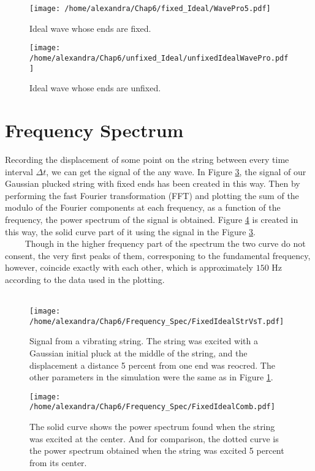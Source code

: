 \documentclass[a4paper,11pt]{article}
\begin{document}
\begin{figure}[htbp]
\centering
\texttt{[image: /home/alexandra/Chap6/fixed\_Ideal/WavePro5.pdf]}
\caption{\sf \small Ideal wave whose ends are fixed.}
\label{fig1}
\end{figure}
\begin{figure}[htbp]
\centering
\texttt{[image: /home/alexandra/Chap6/unfixed\_Ideal/unfixedIdealWavePro.pdf]}
\caption{\sf \small Ideal wave whose ends are unfixed.}
\label{fig2}
\end{figure}

\section{Frequency Spectrum}
\normalsize\qquad Recording the displacement of some point on the string between every time interval $\Delta t$, we can get the signal of 
the any wave. In Figure \ref{fig3}, the signal of our Gaussian plucked string with fixed ends has been created in this way. Then by performing the fast Fourier transformation (FFT) and plotting the sum of the modulo of the Fourier components at each frequency, as a function of the frequency, the power spectrum of the signal is obtained. Figure \ref{fig4} is created in this way, the solid curve part of it using the signal in the Figure \ref{fig3}.\\
$\qquad$ Though in the higher frequency part of the spectrum the two curve do not consent, the very first peaks of them, corresponing to the fundamental frequency, however, coincide exactly with each other, which is approximately $150$ Hz according to the data used in the plotting.\\\\ 

\begin{figure}[htbp]
\centering
\texttt{[image: /home/alexandra/Chap6/Frequency\_Spec/FixedIdealStrVsT.pdf]}
\caption{\sf \footnotesize Signal from a vibrating string. The string was excited with a Gaussian initial pluck at the middle of the string, and the displacement a distance 5 percent from one end was reocred. The other parameters in the simulation were the same as in Figure \ref{fig1}.}
\label{fig3}
\end{figure}

\begin{figure}[htbp]
\centering
\texttt{[image: /home/alexandra/Chap6/Frequency\_Spec/FixedIdealComb.pdf]}
\caption{\sf \footnotesize The solid curve shows the power spectrum found when the string was excited at the center. And for comparison, the dotted curve is the power spectrum obtained when the string was excited 5 percent from its center.}
\label{fig4}
\end{figure}
\end{document}
